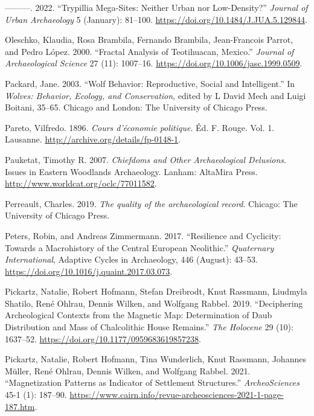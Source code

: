 \documentclass[
  12pt,
  a4paper, twoside]{book}
\newlength{\cslhangindent}
\newlength{\cslentryspacingunit} %
\newenvironment{CSLReferences}[2] %
 {%
  \setlength{\parindent}{0pt}
  \ifodd #1
  \let\oldpar\par
  \def\par{\hangindent=\cslhangindent\oldpar}
  \fi
  \setlength{\parskip}{#2\cslentryspacingunit}
 }%
 {}
\begin{document}
\begin{CSLReferences}{1}{0}
\leavevmode{}%
---------. 2022. {``Trypillia Mega-Sites: Neither Urban nor Low-Density?''} \emph{Journal of Urban Archaeology} 5 (January): 81--100. \url{https://doi.org/10.1484/J.JUA.5.129844}.

\leavevmode{}%
Oleschko, Klaudia, Rosa Brambila, Fernando Brambila, Jean-Francois Parrot, and Pedro López. 2000. {``Fractal Analysis of Teotihuacan, Mexico.''} \emph{Journal of Archaeological Science} 27 (11): 1007--16. \url{https://doi.org/10.1006/jasc.1999.0509}.

\leavevmode{}%
Packard, Jane. 2003. {``Wolf Behavior: Reproductive, Social and Intelligent.''} In \emph{Wolves: Behavior, Ecology, and Conservation}, edited by L David Mech and Luigi Boitani, 35--65. {Chicago and London}: {The University of Chicago Press}.

\leavevmode{}%
Pareto, Vilfredo. 1896. \emph{Cours d'économie politique}. Éd. F. Rouge. Vol. 1. Lausanne. \url{http://archive.org/details/fp-0148-1}.

\leavevmode{}%
Pauketat, Timothy R. 2007. \emph{Chiefdoms and Other Archaeological Delusions}. Issues in Eastern Woodlands Archaeology. Lanham: AltaMira Press. \url{http://www.worldcat.org/oclc/77011582}.

\leavevmode{}%
Perreault, Charles. 2019. \emph{The quality of the archaeological record}. Chicago: The University of Chicago Press.

\leavevmode{}%
Peters, Robin, and Andreas Zimmermann. 2017. {``Resilience and Cyclicity: Towards a Macrohistory of the Central European Neolithic.''} \emph{Quaternary International}, Adaptive Cycles in Archaeology, 446 (August): 43--53. \url{https://doi.org/10.1016/j.quaint.2017.03.073}.

\leavevmode{}%
Pickartz, Natalie, Robert Hofmann, Stefan Dreibrodt, Knut Rassmann, Liudmyla Shatilo, René Ohlrau, Dennis Wilken, and Wolfgang Rabbel. 2019. {``Deciphering Archeological Contexts from the Magnetic Map: Determination of Daub Distribution and Mass of Chalcolithic House Remains.''} \emph{The Holocene} 29 (10): 1637--52. \url{https://doi.org/10.1177/0959683619857238}.

\leavevmode{}%
Pickartz, Natalie, Robert Hofmann, Tina Wunderlich, Knut Rassmann, Johannes Müller, René Ohlrau, Dennis Wilken, and Wolfgang Rabbel. 2021. {``Magnetization Patterns as Indicator of Settlement Structures.''} \emph{ArcheoSciences} 45-1 (1): 187--90. \url{https://www.cairn.info/revue-archeosciences-2021-1-page-187.htm}.


\end{CSLReferences}
\end{document}

